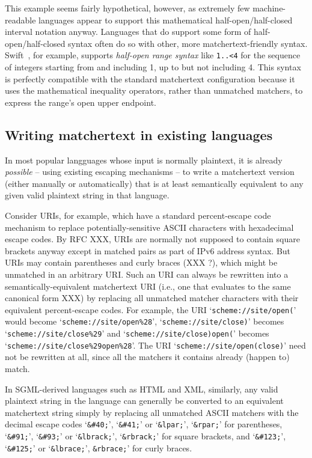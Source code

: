 This example seems fairly hypothetical, however,
as extremely few machine-readable languages
appear to support this mathematical
half-open/half-closed interval notation anyway.
Languages that do support some form of half-open/half-closed syntax
often do so with other, more matchertext-friendly syntax.
Swift~\cite{apple22swift}, for example,
supports \emph{half-open range syntax} like \verb|1..<4|
for the sequence of integers starting from and including 1,
up to but not including 4.
This syntax is perfectly compatible with the standard matchertext configuration
because it uses the mathematical inequality operators,
rather than unmatched matchers,
to express the range's open upper endpoint.


\subsection{Writing matchertext in existing languages}


In most popular langguages whose input is normally plaintext,
it is already \emph{possible} -- using existing escaping mechanisms --
to write a matchertext version
(either manually or automatically)
that is at least semantically equivalent
to any given valid plaintext string in that language.

Consider URIs, for example,
which have a standard percent-escape code mechanism
to replace potentially-sensitive ASCII characters with hexadecimal escape codes.
By RFC XXX, URIs are normally not supposed to contain square brackets anyway
except in matched pairs as part of IPv6 address syntax.
But URIs may contain parentheses and curly braces (XXX ?),
which might be unmatched in an arbitrary URI.
Such an URI can always be rewritten
into a semantically-equivalent matchertext URI
(i.e., one that evaluates to the same canonical form XXX)
by replacing all unmatched matcher characters with their
equivalent percent-escape codes.
For example, the URI `\verb|scheme://site/open(|'
would become `\verb|scheme://site/open%28|',
`\verb|scheme://site/close)|'
becomes `\verb|scheme://site/close%29|'
and `\verb|scheme://site/close)open(|' becomes
`\verb|scheme://site/close%29open%28|'.
The URI `\verb|scheme://site/open(close)|'
need not be rewritten at all,
since all the matchers it contains already (happen to) match.

In SGML-derived languages such as HTML and XML, similarly,
any valid plaintext string in the language
can generally be converted to an equivalent matchertext string
simply by replacing all unmatched ASCII matchers
with the decimal escape codes
`\verb|&#40;|', `\verb|&#41;|' or
`\verb|&lpar;|', `\verb|&rpar;|' for parentheses,
`\verb|&#91;|', `\verb|&#93;|' or
`\verb|&lbrack;|', `\verb|&rbrack;|' for square brackets, and
`\verb|&#123;|', `\verb|&#125;|' or
`\verb|&lbrace;|', \verb|&rbrace;|' for curly braces.

